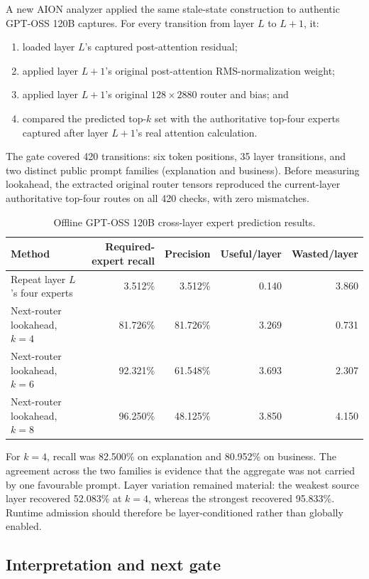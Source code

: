 A new AION analyzer applied the same stale-state construction to authentic
GPT-OSS 120B captures.  For every transition from layer $L$ to $L+1$, it:
\begin{enumerate}
  \item loaded layer $L$'s captured post-attention residual;
  \item applied layer $L+1$'s original post-attention RMS-normalization weight;
  \item applied layer $L+1$'s original $128\times2880$ router and bias; and
  \item compared the predicted top-$k$ set with the authoritative top-four
        experts captured after layer $L+1$'s real attention calculation.
\end{enumerate}

The gate covered 420 transitions: six token positions, 35 layer transitions,
and two distinct public prompt families (explanation and business).  Before
measuring lookahead, the extracted original router tensors reproduced the
current-layer authoritative top-four routes on all 420 checks, with zero
mismatches.

\begin{table}[ht]
\centering
\begin{tabular}{lrrrr}
\toprule
Method & Required-expert recall & Precision & Useful/layer & Wasted/layer \\
\midrule
Repeat layer $L$'s four experts & 3.512\% & 3.512\% & 0.140 & 3.860 \\
Next-router lookahead, $k=4$ & 81.726\% & 81.726\% & 3.269 & 0.731 \\
Next-router lookahead, $k=6$ & 92.321\% & 61.548\% & 3.693 & 2.307 \\
Next-router lookahead, $k=8$ & 96.250\% & 48.125\% & 3.850 & 4.150 \\
\bottomrule
\end{tabular}
\caption{Offline GPT-OSS 120B cross-layer expert prediction results.}
\end{table}

For $k=4$, recall was 82.500\% on explanation and 80.952\% on business.  The
agreement across the two families is evidence that the aggregate was not
carried by one favourable prompt.  Layer variation remained material: the
weakest source layer recovered 52.083\% at $k=4$, whereas the strongest
recovered 95.833\%.  Runtime admission should therefore be layer-conditioned
rather than globally enabled.

\subsection{Interpretation and next gate}

